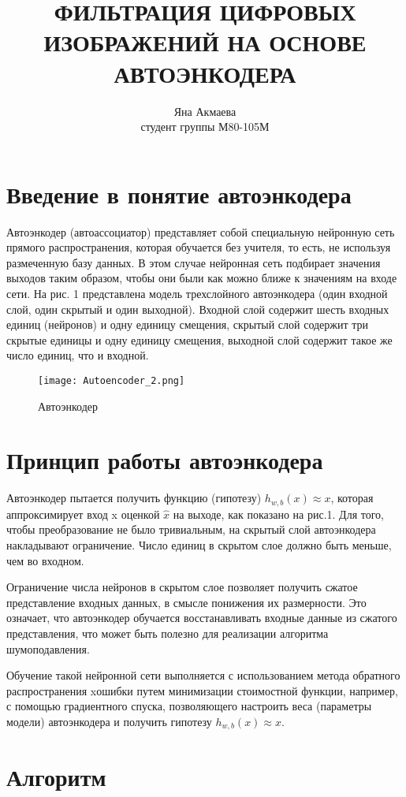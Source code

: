 \documentclass[a4paper,12pt]{article}
\date{}
\author{Яна Акмаева \\студент группы М80-105М}
\title{ФИЛЬТРАЦИЯ ЦИФРОВЫХ ИЗОБРАЖЕНИЙ НА ОСНОВЕ АВТОЭНКОДЕРА}
\begin{document}
\maketitle
\section{Введение в понятие автоэнкодера}
Автоэнкодер (автоассоциатор) представляет собой специальную нейронную сеть прямого распространения, которая обучается без учителя, то есть, не используя размеченную базу данных. В этом случае нейронная
сеть подбирает значения выходов таким образом, чтобы они были как можно ближе к значениям на входе
сети. На рис. 1 представлена модель трехслойного автоэнкодера (один входной слой, один скрытый и один выходной). Входной слой содержит шесть входных единиц (нейронов) и одну единицу смещения, скрытый слой содержит три скрытые единицы и одну единицу смещения, выходной слой содержит такое же число единиц, что и входной.
\begin{figure}[htbp]
	\centering
	\texttt{[image: Autoencoder\_2.png]}
	\caption{Автоэнкодер}\label{fig:autocoder}
\end{figure}
\section{Принцип работы автоэнкодера}

   Автоэнкодер пытается получить функцию (гипотезу) $h_{w,b}(x)\approx x$,  которая аппроксимирует вход x оценкой $\hat{x}$ на выходе, как показано на рис.1. Для того, чтобы преобразование не было тривиальным, на скрытый слой автоэнкодера накладывают ограничение. Число единиц в скрытом слое должно быть меньше, чем во входном.

Ограничение числа нейронов в скрытом слое позволяет получить сжатое представление входных данных, в смысле понижения их размерности. Это означает, что автоэнкодер обучается восстанавливать входные данные из сжатого представления, что может быть полезно для реализации алгоритма шумоподавления.

Обучение такой нейронной сети выполняется с использованием метода обратного распространения
xошибки путем минимизации стоимостной функции, например, с помощью градиентного спуска, позволяющего настроить веса (параметры модели) автоэнкодера и получить гипотезу $h_{w,b}(x)\approx x$.
\section{Алгоритм}
\end{document}
